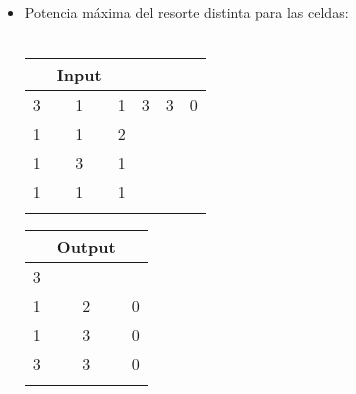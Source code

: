 \documentclass[11pt, a4paper, twoside]{article}
\begin{document}
\begin{itemize}
\begin{itemize}
\begin{itemize}
				\item Potencia m\'axima del resorte distinta para las celdas: \\
				\\
				    \begin{minipage}{0.4\textwidth}
							\begin{tabular}{cccccc}
							 & Input \\
							   \hline
							   3 & 1 & 1 & 3 & 3 & 0\\
							   1 & 1 & 2 &   &   &  \\
							   1 & 3 & 1 &   &   &  \\
							   1 & 1 & 1 &   &   &  \\
							   \\
							\end{tabular}
						\end{minipage} 
							\begin{minipage}{0.3\textwidth}
								\begin{tabular}{ccc}
								  & Output \\
								   \hline
								   3 &   &   \\
								   1 & 2 & 0 \\
								   1 & 3 & 0 \\
								   3 & 3 & 0 \\
								    \\
							\end{tabular}
					\end{minipage} 	\\
					\\
					

\end{itemize}
\end{itemize}
\end{itemize}
\end{document}
